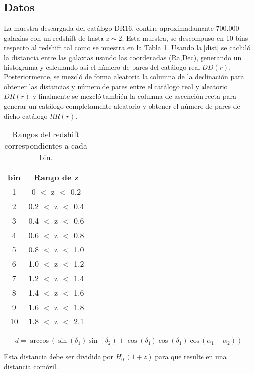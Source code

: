\documentclass[twocolumn,letterpaper,spanish]{revtex4}
\numberwithin{equation}{section}
\begin{document}
\subsection{Datos}

La muestra descargada del cat\'alogo DR16, contine aproximadamente 700.000 galaxias con un redshift de hasta $z \sim 2$. Esta muestra, se descompuso en 10 bins respecto al redshift tal como se muestra en la Tabla \ref{tabla}. Usando la \eqref{dist} se caclul\'o la distancia entre las galaxias usando las coordenadas (Ra,Dec), generando un histograma y calculando as\'i el n\'umero de pares del cat\'alogo real $DD(r)$. Posteriormente, se mezcl\'o de forma aleatoria la columna de la declinaci\'on para obtener las distancias y n\'umero de pares entre el cat\'alogo real y aleatorio $DR(r)$ y finalmente se mezcl\'o tambi\'en la columna de ascenci\'on recta para generar un cat\'alogo completamente aleatorio y obtener el n\'umero de pares de dicho cat\'alogo $RR(r)$.
\begin{table}[t]
\begin{center}
 \begin{tabular}{c  c}
	bin & Rango de z\\ \hline
	1  & 0   $<$ z $<$ 0.2  \\
	2  & 0.2 $<$ z $<$ 0.4  \\
	3  & 0.4 $<$ z $<$ 0.6  \\
	4  & 0.6 $<$ z $<$ 0.8  \\
	5  & 0.8 $<$ z $<$ 1.0  \\
	6  & 1.0 $<$ z $<$ 1.2  \\
	7  & 1.2 $<$ z $<$ 1.4  \\
	8  & 1.4 $<$ z $<$ 1.6  \\
	9  & 1.6 $<$ z $<$ 1.8  \\
	10 & 1.8 $<$ z $<$ 2.1  \\
 \end{tabular}
 \caption{Rangos del redshift correspondientes a cada bin.}
\label{tabla}
\end{center}
\end{table}


\begin{equation}\label{dist}
d=\arccos(\sin(\delta_1)\sin(\delta_2)+\cos(\delta_1)\cos(\delta_1)\cos(\alpha_1-\alpha_2))
\end{equation}

Esta distancia debe ser dividida por $H_0\,(1+z)$ para que resulte en una distancia com\'ovil.\\
\end{document}
